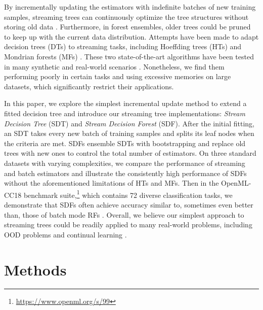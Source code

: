 By incrementally updating the estimators with indefinite batches of new training samples, streaming trees can continuously optimize the tree structures without storing old data \citep{domingos_mining_2000, bifet_adaptive_2009, lakshminarayanan_mondrian_2014, ben-haim_streaming_2010}. Furthermore, in forest ensembles, older trees could be pruned to keep up with the current data distribution. Attempts have been made to adapt decision trees (DTs) to streaming tasks, including Hoeffding trees (HTs) and Mondrian forests (MFs) \citep{domingos_mining_2000, lakshminarayanan_mondrian_2014}. These two state-of-the-art algorithms have been tested in many synthetic and real-world scenarios \citep{pfahringer_new_2007, gomes_machine_2019, lakshminarayanan_mondrian_2016, khannouz_benchmark_2020}. Nonetheless, we find them performing poorly in certain tasks and using excessive memories on large datasets, which significantly restrict their applications.

In this paper, we explore the simplest incremental update method to extend a fitted decision tree and introduce our streaming tree implementations: \textit{Stream Decision Tree} (SDT) and \textit{Stream Decision Forest} (SDF).
After the initial fitting, an SDT takes every new batch of training samples and splits its leaf nodes when the criteria are met. SDFs ensemble SDTs with bootstrapping and replace old trees with new ones to control the total number of estimators. 
On three standard datasets with varying complexities, we compare the performance of streaming and batch estimators and illustrate the consistently high performance of SDFs without the aforementioned limitations of HTs and MFs. Then in the OpenML-CC18 benchmark suite,\footnote{\url{https://www.openml.org/s/99}} which contains 72 diverse classification tasks, we demonstrate that SDFs often achieve accuracy similar to, sometimes even better than, those of batch mode RFs \citep{vanschoren_openml_2013, bischl_openml_2019}. Overall, we believe our simplest approach to streaming trees could be readily applied to many real-world problems, including OOD problems and continual learning \citep{geisa_towards_2021, van_de_ven_three_2019}.

\section{Methods} 
\label{methods}

